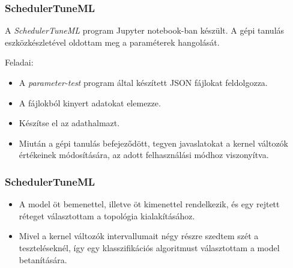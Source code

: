 \documentclass{beamer}
\begin{document}
\begin{frame}
\frametitle{SchedulerTuneML}
A \textit{SchedulerTuneML} program Jupyter notebook-ban készült. A gépi tanulás eszközkészletével oldottam meg a paraméterek hangolását.

\medskip

Feladai:
\begin{itemize}
\item A \textit{parameter-test} program által készített JSON fájlokat feldolgozza.
\item A fájlokból kinyert adatokat elemezze.
\item Készítse el az adathalmazt.
\item Miután a gépi tanulás befejeződött, tegyen javaslatokat a kernel változók értékeinek módosítására, az adott felhasználási módhoz viszonyítva.
\end{itemize}   

\end{frame}


\begin{frame}
\frametitle{SchedulerTuneML}

\begin{itemize}
\item A model öt bemenettel, illetve öt kimenettel rendelkezik, és egy rejtett réteget választottam a topológia kialakításához.
\item Mivel a kernel változók intervallumait négy részre szedtem szét a teszteléseknél, így egy klasszifikációs algoritmust választottam a model betanítására.
\end{itemize} 

\end{frame}
\end{document}
